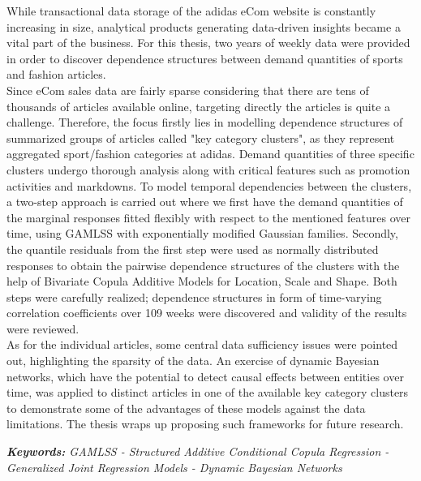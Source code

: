 



While transactional data storage of the adidas eCom website is constantly increasing in size, analytical products generating data-driven insights became a vital part of the business. For this thesis, two years of weekly data were provided in order to discover dependence structures between demand quantities of sports and fashion articles.
\\

Since eCom sales data are fairly sparse considering that there are tens of thousands of articles available online, targeting directly the articles is quite a challenge. Therefore, the focus firstly lies in modelling dependence structures of summarized groups of articles called "key category clusters", as they represent aggregated sport/fashion categories at adidas. Demand quantities of three specific clusters undergo thorough analysis along with critical features such as promotion activities and markdowns. To model temporal dependencies between the clusters, a two-step approach is carried out where we first have the demand quantities of the marginal responses fitted flexibly with respect to the mentioned features over time, using GAMLSS with exponentially modified Gaussian families. Secondly, the quantile residuals from the first step were used as normally distributed responses to obtain the pairwise dependence structures of the clusters with the help of Bivariate Copula Additive Models for Location, Scale and Shape. Both steps were carefully realized; dependence structures in form of time-varying correlation coefficients over 109 weeks were discovered and validity of the results were reviewed.
\\

As for the individual articles, some central data sufficiency issues were pointed out, highlighting the sparsity of the data. An exercise of dynamic Bayesian networks, which have the potential to detect causal effects between entities over time, was applied to distinct articles in one of the available key category clusters to demonstrate some of the advantages of these models against the data limitations. The thesis wraps up proposing such frameworks for future research.


\vspace{1cm}

\textit{\textbf{Keywords:} GAMLSS - Structured Additive Conditional Copula Regression - Generalized Joint Regression Models - Dynamic Bayesian Networks}


